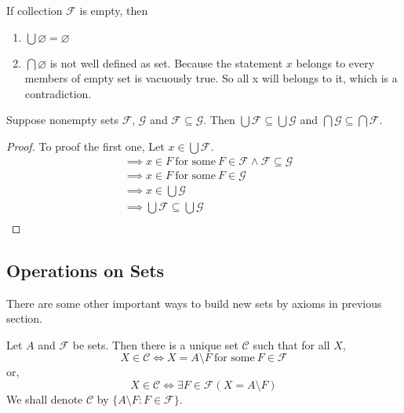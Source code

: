 \begin{remark}
    If collection $\mathcal{F}$ is empty, then\\
    \begin{enumerate}
        \item $\bigcup \varnothing = \varnothing$
        \item $\bigcap \varnothing$ is not well defined as set. Because
            the statement $x$ belongs to every members of empty set is
            vacuously true. So all x will belongs to it, which is a
            contradiction.
    \end{enumerate}
\end{remark}

\begin{theorem}{}{}
    Suppose nonempty sets $\mathcal{F}$, $\mathcal{G}$ and $\mathcal{F}
    \subseteq \mathcal{G}$. Then $\bigcup \mathcal{F} \subseteq \bigcup
    \mathcal{G}$ and $\bigcap \mathcal{G} \subseteq \bigcap \mathcal{F}$.
\end{theorem}

\begin{proof}
    To proof the first one, Let $x \in \bigcup \mathcal{F}$.
    \begin{align*}
        &\implies x \in F \ \text{for some}\ F \in \mathcal{F} \land
        \mathcal{F} \subseteq \mathcal{G} \\
        &\implies x \in F \ \text{for some}\ F \in \mathcal{G}\\
        &\implies x \in \bigcup \mathcal{G}\\
        &\implies \bigcup \mathcal{F} \subseteq \bigcup \mathcal{G}\\
    \end{align*}
\end{proof}

\newpage

\subsection{Operations on Sets}

There are some other important ways to build new sets by axioms in
previous section.

\begin{lemma}{}{}
    Let $A$ and $\mathcal{F}$ be sets. Then there is a unique set
    $\mathcal{C}$ such that for all $X$,
    \begin{equation*}
        X \in \mathcal{C} \iff X = A \setminus F\ \text{for some}\ F
        \in \mathcal{F}
    \end{equation*}
    or,
    \begin{equation*}
        X \in \mathcal{C} \iff \exists F \in \mathcal{F}(X = A \setminus F)
    \end{equation*}
    We shall denote $\mathcal{C}$ by $\{A \setminus F: F \in \mathcal{F}\}$.
\end{lemma}

